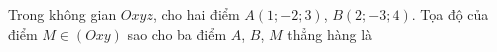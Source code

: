 \begin{ex}
Trong không gian $Oxyz$, cho hai điểm $A(1;-2;3)$, $B(2;-3;4)$. Tọa độ của điểm $M\in(Oxy)$ sao cho ba điểm $A$, $B$, $M$ thẳng hàng là
\end{ex}
